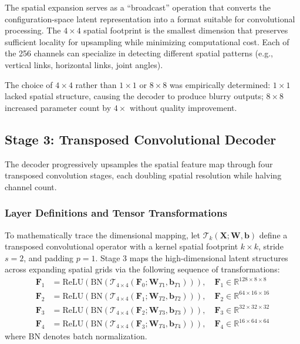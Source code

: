 \documentclass[12pt,a4paper,oneside]{report}
\begin{document}
The spatial expansion serves as a ``broadcast'' operation that converts the configuration-space latent representation into a format suitable for convolutional processing. The $4 \times 4$ spatial footprint is the smallest dimension that preserves sufficient locality for upsampling while minimizing computational cost. Each of the 256 channels can specialize in detecting different spatial patterns (e.g., vertical links, horizontal links, joint angles).

The choice of $4 \times 4$ rather than $1 \times 1$ or $8 \times 8$ was empirically determined: $1 \times 1$ lacked spatial structure, causing the decoder to produce blurry outputs; $8 \times 8$ increased parameter count by $4\times$ without quality improvement.

\subsection{Stage 3: Transposed Convolutional Decoder}

The decoder progressively upsamples the spatial feature map through four transposed convolution stages, each doubling spatial resolution while halving channel count.

\subsubsection{Layer Definitions and Tensor Transformations}

To mathematically trace the dimensional mapping, let $\mathcal{T}_k(\mathbf{X}; \mathbf{W}, \mathbf{b})$ define a transposed convolutional operator with a kernel spatial footprint $k \times k$, stride $s=2$, and padding $p=1$. Stage 3 maps the high-dimensional latent structures across expanding spatial grids via the following sequence of transformations:
\begin{align}
\mathbf{F}_1 &= \text{ReLU}\left(\text{BN}\left(\mathcal{T}_{4\times4}(\mathbf{F}_0; \mathbf{W}_{T1}, \mathbf{b}_{T1})\right)\right), \quad \mathbf{F}_1 \in \mathbb{R}^{128 \times 8 \times 8} \\
\mathbf{F}_2 &= \text{ReLU}\left(\text{BN}\left(\mathcal{T}_{4\times4}(\mathbf{F}_1; \mathbf{W}_{T2}, \mathbf{b}_{T2})\right)\right), \quad \mathbf{F}_2 \in \mathbb{R}^{64 \times 16 \times 16} \\
\mathbf{F}_3 &= \text{ReLU}\left(\text{BN}\left(\mathcal{T}_{4\times4}(\mathbf{F}_2; \mathbf{W}_{T3}, \mathbf{b}_{T3})\right)\right), \quad \mathbf{F}_3 \in \mathbb{R}^{32 \times 32 \times 32} \\
\mathbf{F}_4 &= \text{ReLU}\left(\text{BN}\left(\mathcal{T}_{4\times4}(\mathbf{F}_3; \mathbf{W}_{T4}, \mathbf{b}_{T4})\right)\right), \quad \mathbf{F}_4 \in \mathbb{R}^{16 \times 64 \times 64}
\end{align}
where BN denotes batch normalization.
\end{document}
